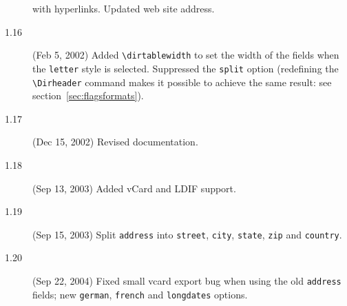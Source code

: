 \documentclass[10pt]{article}
\renewcommand{\Dirheader}[1]{\item\hspace{-\dirindent}\textbf{\MakeUppercase{#1}}}
\begin{document}
\begin{description}
with hyperlinks. Updated web site address.
\item[1.16] (Feb 5, 2002)
Added \verb'\dirtablewidth' to set the width of the fields when the
\texttt{letter} style is selected. Suppressed the \texttt{split} option
(redefining the \verb'\Dirheader' command makes it possible to achieve the
same result: see section~\ref{sec:flagsformats}).
\item[1.17] (Dec 15, 2002)
Revised documentation.
\item[1.18] (Sep 13, 2003)
Added vCard and LDIF support.
\item[1.19] (Sep 15, 2003)
Split \texttt{address} into \texttt{street}, \texttt{city}, \texttt{state},
\texttt{zip} and \texttt{country}.
\item[1.20] (Sep 22, 2004)
Fixed small vcard export bug when using the old \texttt{address} fields;
new \texttt{german}, \texttt{french} and \texttt{longdates} options.
\end{description}
\end{document}
